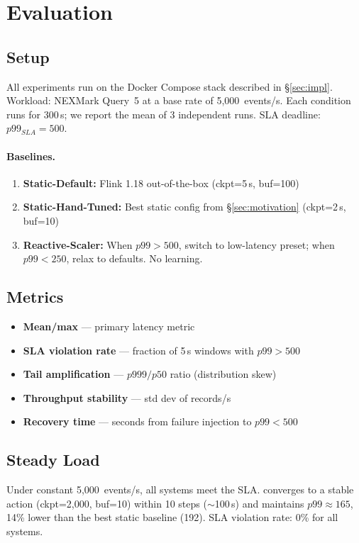 \section{Evaluation}
\label{sec:eval}

\subsection{Setup}
All experiments run on the Docker Compose stack described in \S\ref{sec:impl}.
Workload: NEXMark Query~5 at a base rate of 5{,}000~events/s.
Each condition runs for 300\,s; we report the mean of 3 independent runs.
SLA deadline: $p99_{SLA}=500$\ms.

\paragraph{Baselines.}
\begin{enumerate}
  \item \textbf{Static-Default:} Flink 1.18 out-of-the-box (ckpt=5\,s, buf=100\ms)
  \item \textbf{Static-Hand-Tuned:} Best static config from \S\ref{sec:motivation}
    (ckpt=2\,s, buf=10\ms)
  \item \textbf{Reactive-Scaler:} When $p99>500$\ms, switch to low-latency
    preset; when $p99<250$\ms, relax to defaults. No learning.
\end{enumerate}

\subsection{Metrics}
\begin{itemize}
  \item \textbf{Mean/max } — primary latency metric
  \item \textbf{SLA violation rate} — fraction of 5\,s windows with $p99>500$\ms
  \item \textbf{Tail amplification} — $p999/p50$ ratio (distribution skew)
  \item \textbf{Throughput stability} — std dev of records/s
  \item \textbf{Recovery time} — seconds from failure injection to $p99<500$\ms
\end{itemize}

\subsection{Steady Load}
Under constant 5{,}000~events/s, all systems meet the SLA.
\xtal converges to a stable action (ckpt=2{,}000\ms, buf=10\ms)
within 10 steps ($\sim$100\,s) and maintains $p99\approx165$\ms,
14\% lower than the best static baseline (192\ms).
SLA violation rate: 0\% for all systems.

